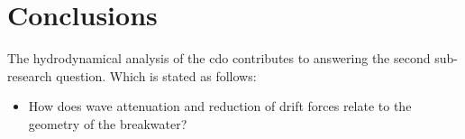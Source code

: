 









\section{Conclusions}
\label{sec: conclusions captive design optimization}





The hydrodynamical analysis of the \acrshort{cdo} contributes to answering the second sub-research question. Which is stated as follows:
\begin{itemize}
    \item How does wave attenuation and reduction of drift forces relate to the geometry of the  breakwater?
\end{itemize}

